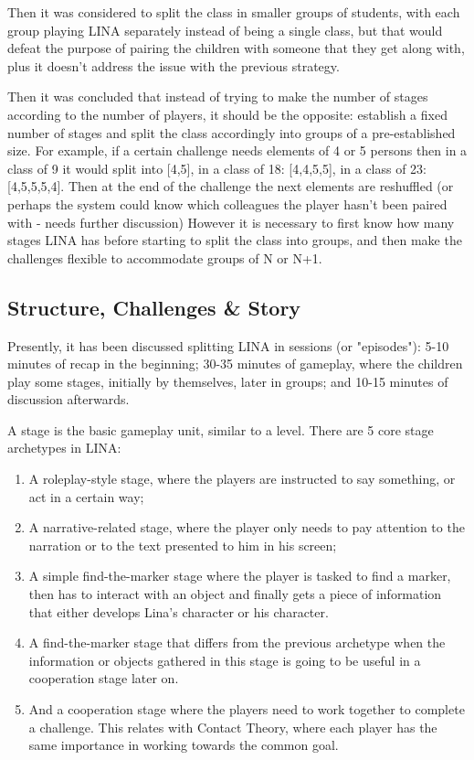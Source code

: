 \par Then it was considered to split the class in smaller groups of students, with each group playing LINA separately instead of being a single class, but that would defeat the purpose of pairing the children with someone that they get along with, plus it doesn't address the issue with the previous strategy.
\par Then it was concluded that instead of trying to make the number of stages according to the number of players, it should be the opposite: establish a fixed number of stages and split the class accordingly into groups of a pre-established size. For example, if a certain challenge needs elements of 4 or 5 persons then in a class of 9 it would split into [4,5], in a class of 18: [4,4,5,5], in a class of 23: [4,5,5,5,4]. Then at the end of the challenge the next elements are reshuffled (or perhaps the system could know which colleagues the player hasn't been paired with - needs further discussion) However it is necessary to first know how many stages LINA has before starting to split the class into groups, and then make the challenges flexible to accommodate groups of N or N+1.


\subsection{Structure, Challenges \& Story}
\par Presently, it has been discussed splitting LINA in sessions (or "episodes"): 5-10 minutes of recap in the beginning; 30-35 minutes of gameplay, where the children play some stages, initially by themselves, later in groups; and 10-15 minutes of discussion afterwards. 
\par A stage is the basic gameplay unit, similar to a level. There are 5 core stage archetypes in LINA:
\begin{enumerate}
	\item A roleplay-style stage, where the players are instructed to say something, or act in a certain way;
	\item A narrative-related stage, where the player only needs to pay attention to the narration or to the text presented to him in his screen;
	\item A simple find-the-marker stage where the player is tasked to find a marker, then has to interact with an object and finally gets a piece of information that either develops Lina's character or his character. 
	\item A find-the-marker stage that differs from the previous archetype when the information or objects gathered in this stage is going to be useful in a cooperation stage later on.
	\item And a cooperation stage where the players need to work together to complete a challenge. This relates with Contact Theory, where each player has the same importance in working towards the common goal.
\end{enumerate}

